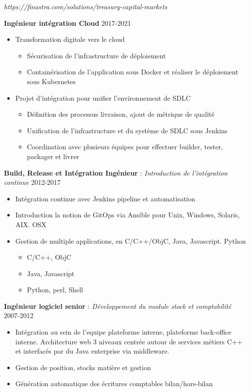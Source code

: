 \documentclass[11pt,a4paper]{moderncv}
\begin{document}
{
\textit{https://finastra.com/solutions/treasury-capital-markets}
\bigskip

\textbf{Ingénieur intégration Cloud} \hfill 2017-2021
\bigskip
	\begin{itemize}%
		\item Transformation digitale vers le cloud
			\begin{itemize}%
				\item Sécurisation de l'infrastructure de déploiement
				\item Containérisation de l'application sous Docker et réaliser le déploiement sous Kubernetes
			\end{itemize}
	\end{itemize}
\bigskip
	\begin{itemize}%
	\item	Projet d'intégration pour unifier l'environnement de SDLC
		\begin{itemize}%
				\item Définition des processus livraison, ajout de métrique de qualité
				\item Unification de l'infrastructure et du système de SDLC sous Jenkins
				\item Coordination avec plusieurs équipes pour effectuer builder, tester, packager  et livrer
		\end{itemize}
	\end{itemize}
\bigskip
 \textbf{Build, Release et Intégration Ingénieur} : \textit{Introduction de l'intégration continue} \hfill 2012-2017
\bigskip
			\begin{itemize}%
				\item Intégration continue avec Jenkins pipeline et automatisation
                \item Introduction la notion de GitOps via Ansible pour Unix, Windows, Solaris, AIX. OSX
				\item Gestion de multiple applications, en C/C++/ObjC, Java, Javascript. Python
					\begin{itemize}
						\item C/C++, ObjC
						\item Java, Javascript
						\item Python, perl, Shell
					\end{itemize}
				\end{itemize}
\bigskip
\textbf{Ingénieur logiciel senior} : \textit{Développement du module stock et comptabilité} \hfill 2007-2012

\bigskip
			\begin{itemize}
				\item Intégration au sein de l'equipe plateforme interne, plateforme back-office interne. Architecture web 3 niveaux centrée autour de services métiers C++ et interfacés par du Java enterprise via middleware.
				\item Gestion de position, stocks matière et gestion
				\item Génération automatique des écritures comptables bilan/hors-bilan
			\end{itemize}
}
\end{document}
